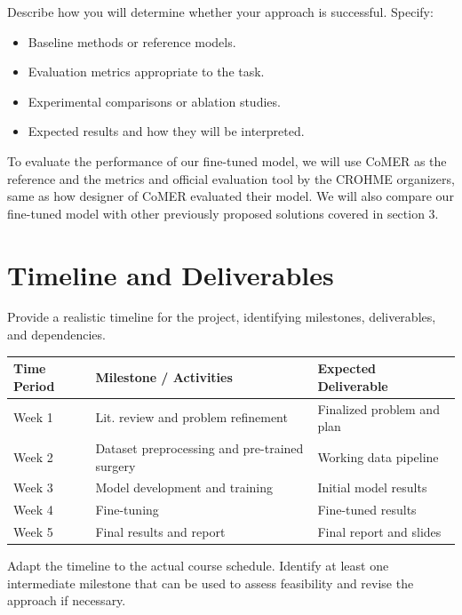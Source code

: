 \documentclass[11pt]{article}
\newcommand{\blue}[1]{\textcolor{cyan!60!black}{#1}}
\begin{document}
Describe how you will determine whether your approach is successful. Specify:
\begin{itemize}[noitemsep]
    \item Baseline methods or reference models.
    \item Evaluation metrics appropriate to the task.
    \item Experimental comparisons or ablation studies.
    \item Expected results and how they will be interpreted.
\end{itemize}
\blue{
  To evaluate the performance of our fine-tuned model, we will use CoMER as the
  reference and the metrics and official evaluation tool by the CROHME
  organizers, same as how designer of CoMER evaluated their model. We will also
  compare our fine-tuned model with other previously proposed solutions covered
  in section 3.
}

\section{Timeline and Deliverables}

Provide a realistic timeline for the project, identifying milestones,
deliverables, and dependencies.

\begin{center}
\begin{tabularx}{\textwidth}{p{} X X}
    \toprule
    \textbf{Time Period} &
    \textbf{Milestone / Activities} &
    \textbf{Expected Deliverable} \\
    \midrule
    Week 1 & \blue{Lit. review and problem refinement} & \blue{Finalized problem and plan} \\
    Week 2 & \blue{Dataset preprocessing and pre-trained surgery} & \blue{Working data pipeline} \\
    Week 3 & \blue{Model development and training} & \blue{Initial model results} \\
    Week 4 & \blue{Fine-tuning} & \blue{Fine-tuned results} \\
    Week 5 & \blue{Final results and report} & \blue{Final report and slides} \\
    \bottomrule
\end{tabularx}
\end{center}

Adapt the timeline to the actual course schedule. Identify at least
one intermediate milestone that can be used to assess feasibility
and revise the approach if necessary.
\end{document}
